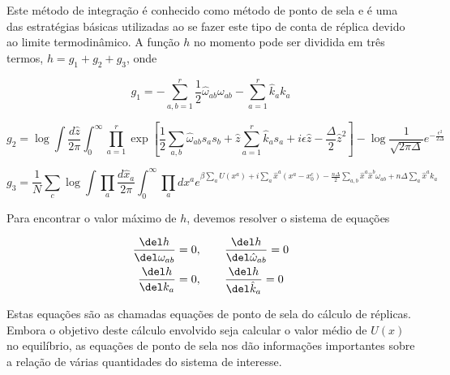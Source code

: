 Este método de integração é conhecido como método de ponto de sela e é
uma das estratégias básicas utilizadas ao se fazer este tipo de conta
de réplica devido ao limite termodinâmico. A função $h$ no momento
pode ser dividida em três termos, $h = g_1 + g_2 + g_3$, onde

\begin{equation}
  \label{eq:40}
  g_1 = -\sum_{a,b=1}^r  \frac{1}{2} \hat{\omega}_{ab} \omega_{ab} - \sum_{a=1}^r
  \hat{k}_a k_a 
\end{equation}

\begin{equation}
  \label{eq:41}
  g_2 = \log \int \frac{d\hat{z}}{2\pi} \int_0^\infty \prod_{a=1}^r
  \exp \left[ \frac{1}{2} \sum_{a,b} \hat{\omega}_{ab} s_a s_b +
    \hat{z} \sum_{a=1}^r \hat{k}_a s_a + i\epsilon \hat{z} -
    \frac{\Delta}{2} \hat{z}^2\right] - \log \frac{1}{\sqrt{2\pi\Delta}}
      e^{-\frac{\epsilon^2}{2\Delta}}
\end{equation}

\begin{equation}
  \label{eq:42}
  g_3 = \frac{1}{N} \sum_c \log \int \prod_a \frac{d\hat{x}_a}{2\pi}
  \int_0^\infty \prod_a dx^a e^{\beta \sum_a U(x^a) + i \sum_a
    \hat{x}^a(x^a-x_0^c) - \frac{n\Delta}{2} \sum_{a,b} \hat{x}^a
    \hat{x}^b \omega_{ab} + n\Delta \sum_a \hat{x}^a k_a }
\end{equation}


Para encontrar o valor máximo de $h$, devemos resolver o sistema de
equações

\begin{align}
  \label{eq:43}
  \frac{\del h}{\del \omega_{ab}}& = 0, \quad \quad \frac{\del h}{\del
    \hat{\omega}_{ab}} = 0 \nonumber \\     \frac{\del h}{\del
    k_{a}}& = 0, \quad \quad  \frac{\del h}{\del \hat{k}_a}= 0 
\end{align}

Estas equações são as chamadas equações de ponto de sela do cálculo de
réplicas. Embora o objetivo deste cálculo envolvido seja calcular o
valor médio de $U(x)$ no equilíbrio, as equações de ponto de sela nos
dão informações importantes sobre a relação de várias quantidades do
sistema de interesse.

